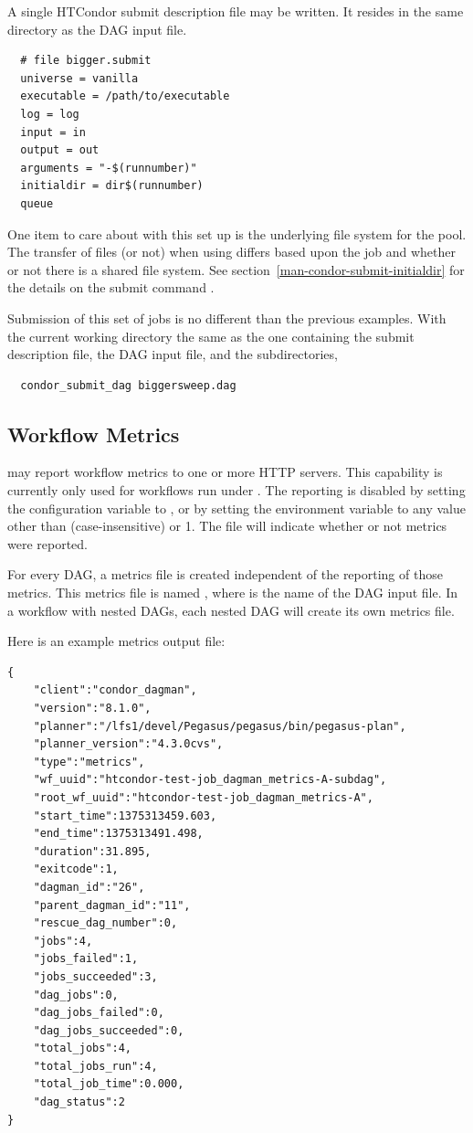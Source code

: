 A single HTCondor submit description file may be written.
It resides in the same directory as the DAG input file.
\begin{verbatim}
  # file bigger.submit
  universe = vanilla
  executable = /path/to/executable
  log = log
  input = in
  output = out
  arguments = "-$(runnumber)"
  initialdir = dir$(runnumber)
  queue
\end{verbatim}

One item to care about with this set up is the underlying file system 
for the pool.
The transfer of files (or not) when using 
differs based upon the job  and whether or not there
is a shared file system.
See section~\ref{man-condor-submit-initialdir} for the details on the
submit command .

Submission of this set of jobs is no different than the previous
examples.  
With the current working directory the same as the one containing
the submit description file, the DAG input file, and the subdirectories,
\begin{verbatim}
  condor_submit_dag biggersweep.dag
\end{verbatim}

\subsection{\label{sec:DAGMetrics}Workflow Metrics}

 may report workflow metrics to one or more HTTP servers.  
This capability is currently only used for workflows run under .  
The reporting is
disabled by setting the  configuration
variable to ,
or by setting the  environment
variable to any value other than  (case-insensitive) or 1.
The  file will indicate whether or not metrics were
reported.

For every DAG, a metrics file is created independent of the reporting
of those metrics.
This metrics file is named
,
where  is the name of the DAG input file.
In a workflow
with nested DAGs, each nested DAG will create its own metrics file.

Here is an example metrics output file:
\begin{verbatim} 
{
    "client":"condor_dagman",
    "version":"8.1.0",
    "planner":"/lfs1/devel/Pegasus/pegasus/bin/pegasus-plan",
    "planner_version":"4.3.0cvs",
    "type":"metrics",
    "wf_uuid":"htcondor-test-job_dagman_metrics-A-subdag",
    "root_wf_uuid":"htcondor-test-job_dagman_metrics-A",
    "start_time":1375313459.603,
    "end_time":1375313491.498,
    "duration":31.895,
    "exitcode":1,
    "dagman_id":"26",
    "parent_dagman_id":"11",
    "rescue_dag_number":0,
    "jobs":4,
    "jobs_failed":1,
    "jobs_succeeded":3,
    "dag_jobs":0,
    "dag_jobs_failed":0,
    "dag_jobs_succeeded":0,
    "total_jobs":4,
    "total_jobs_run":4,
    "total_job_time":0.000,
    "dag_status":2
}
\end{verbatim} 


